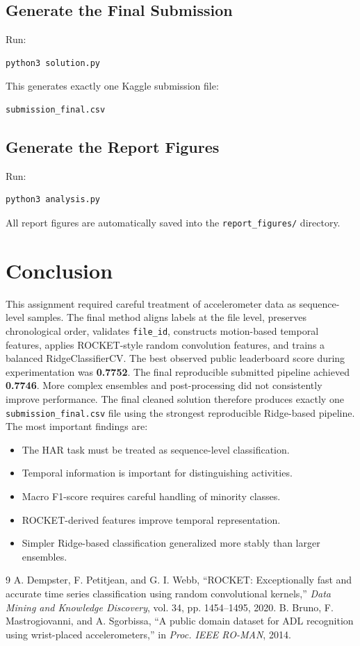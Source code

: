 \documentclass[conference]{IEEEtran}
\begin{document}
\subsection{Generate the Final Submission}
Run:
\begin{verbatim}
python3 solution.py
\end{verbatim}
This generates exactly one Kaggle submission file:
\begin{verbatim}
submission_final.csv
\end{verbatim}
\subsection{Generate the Report Figures}
Run:
\begin{verbatim}
python3 analysis.py
\end{verbatim}
All report figures are automatically saved into the \texttt{report\_figures/} directory.
\section{Conclusion}
This assignment required careful treatment of accelerometer data as sequence-level samples. The final method aligns labels at the file level, preserves chronological order, validates \texttt{file\_id}, constructs motion-based temporal features, applies ROCKET-style random convolution features, and trains a balanced RidgeClassifierCV.
The best observed public leaderboard score during experimentation was \textbf{0.7752}. The final reproducible submitted pipeline achieved \textbf{0.7746}. More complex ensembles and post-processing did not consistently improve performance. The final cleaned solution therefore produces exactly one \texttt{submission\_final.csv} file using the strongest reproducible Ridge-based pipeline.
The most important findings are:
\begin{itemize}[noitemsep]
    \item The HAR task must be treated as sequence-level classification.
    \item Temporal information is important for distinguishing activities.
    \item Macro F1-score requires careful handling of minority classes.
    \item ROCKET-derived features improve temporal representation.
    \item Simpler Ridge-based classification generalized more stably than larger ensembles.
\end{itemize}
\begin{thebibliography}{9}
A. Dempster, F. Petitjean, and G. I. Webb,
``ROCKET: Exceptionally fast and accurate time series classification using random convolutional kernels,''
\textit{Data Mining and Knowledge Discovery}, vol. 34, pp. 1454--1495, 2020.
B. Bruno, F. Mastrogiovanni, and A. Sgorbissa,
``A public domain dataset for ADL recognition using wrist-placed accelerometers,''
in \textit{Proc. IEEE RO-MAN}, 2014.
\end{thebibliography}
\end{document}
